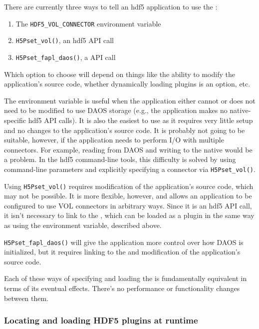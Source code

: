 \documentclass[../users_guide.tex]{subfiles}
\begin{document}
There are currently three ways to tell an \acrshort{hdf5} application to use
the \dvc{}: 

\begin{enumerate}
    \item The \texttt{HDF5\_VOL\_CONNECTOR} environment variable
    \item \texttt{H5Pset\_vol()}, an \acrshort{hdf5} API call
    \item \texttt{H5Pset\_fapl\_daos()}, a \dvc{} API call
\end{enumerate}

Which option to choose will depend on things like the ability to modify the
application's source code, whether dynamically loading plugins is an option,
etc.

The environment variable is useful when the application either cannot or
does not need to be modified to use DAOS storage (e.g., the application makes
no native-specific \acrshort{hdf5} API calls). It is also the easiest to use
as it requires very little setup and no changes to the application's source
code. It is probably not going to be suitable, however, if the application
needs to perform I/O with multiple connectors. For example, reading from DAOS
and writing to the native \vc{} would be a problem. In the \acrshort{hdf5}
command-line tools, this difficulty is solved by using command-line parameters
and explicitly specifying a connector via \texttt{H5Pset\_vol()}.

Using \texttt{H5Pset\_vol()} requires modification of the application's
source code, which may not be possible. It is more flexible,
however, and allows an application to be configured to use VOL connectors in
arbitrary ways. Since it is an \acrshort{hdf5} API call, it isn't necessary to
link to the \dvc{}, which can be loaded as a plugin in the same way as using
the environment variable, described above.

\texttt{H5Pset\_fapl\_daos()} will give the application more control over how
DAOS is initialized, but it requires linking to the \dvc{} and modification of
the application's source code.

Each of these ways of specifying and loading the \dvc{} is fundamentally
equivalent in terms of its eventual effects. There's no performance or
functionality changes between them.

\subsubsection{Locating and loading HDF5 plugins at runtime}
\end{document}
